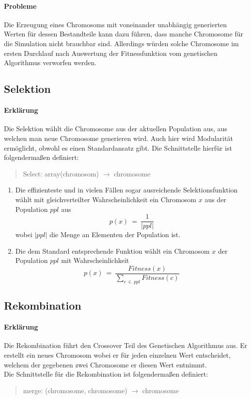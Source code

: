 \documentclass[12pt,a4paper]{scrartcl}
\begin{document}
\paragraph{Probleme}
Die Erzeugung eines Chromosoms mit voneinander unabhängig generierten Werten für dessen Bestandteile kann dazu führen, dass manche Chromosome für die Simulation nicht brauchbar sind. Allerdings  würden solche Chromosome im ersten Durchlauf nach Auswertung der Fitnessfunktion vom genetischen Algorithmus verworfen werden.

\subsection{Selektion}
\paragraph{Erklärung}
Die Selektion wählt die Chromosome aus der aktuellen Population aus, aus welchen man neue Chromosome generieren wird. Auch hier wird Modularität ermöglicht, obwohl es einen Standardansatz gibt. Die Schnittstelle hierfür ist folgendermaßen definiert:
\begin{quote}
 \textsf{Select: array(chromosom) $\rightarrow$ chromosome}
\end{quote}
\begin{enumerate}
	\item Die effizienteste und in vielen Fällen sogar ausreichende Selektionsfunktion wählt mit gleichverteilter Wahrscheinlichkeit ein Chromosom $x$ aus der Population $ppl$ aus $$p(x) ~=~ \frac{1}{|ppl|}$$ wobei $|ppl|$ die Menge an Elementen der Population ist.
	\item Die dem Standard entsprechende Funktion wählt ein Chromosom $x$ der Population $ppl$ mit Wahrscheinlichkeit $$p(x)~=~\frac{Fitness(x)}{\sum_{c ~\in~ ppl}^{}{Fitness(c)}}$$
\end{enumerate}

\subsection{Rekombination}
\paragraph{Erklärung}
Die Rekombination führt den Crossover Teil des Genetischen Algorithmus aus. Er erstellt ein neues Chromosom wobei er für jeden einzelnen Wert entscheidet, welchem der gegebenen zwei Chromosome er diesen Wert entnimmt.\\
Die Schnittstelle für die Rekombination ist folgendermaßen definiert: 
\begin{quote}
	\textsf{merge: (chromosome, chromosome) $\rightarrow$ chromosome}
\end{quote}
\end{document}
